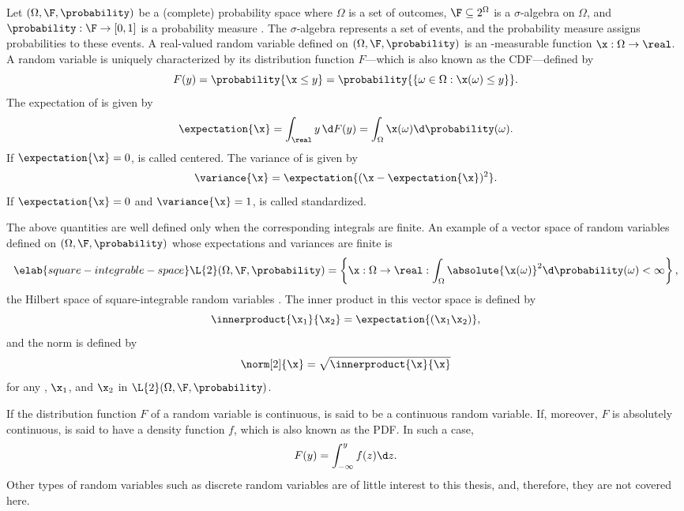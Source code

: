 Let $(\Omega, \F, \probability)$ be a (complete) probability space where
$\Omega$ is a set of outcomes, $\F \subseteq 2^\Omega$ is a $\sigma$-algebra on
$\Omega$, and $\probability: \F \to [0, 1]$ is a probability measure
\cite{durrett2010}. The $\sigma$-algebra represents a set of events, and the
probability measure assigns probabilities to these events. A real-valued random
variable defined on $(\Omega, \F, \probability)$ is an \F-measurable function
$\x: \Omega \to \real$. A random variable \x is uniquely characterized by its
distribution function $F$---which is also known as the \acf{CDF}---defined by
\begin{equation*}
  F(y) = \probability{\x \leq y} = \probability{\{ \omega \in \Omega: \x(\omega) \leq y \}}.
\end{equation*}
The expectation of \x is given by
\[
  \expectation{\x} = \int_\real y \, \d F(y) = \int_\Omega \x(\omega) \d \probability(\omega).
\]
If $\expectation{\x} = 0$, \x is called centered. The variance of \x is given
by
\[
  \variance{\x} = \expectation{(\x - \expectation{\x})^2}.
\]
If $\expectation{\x} = 0$ and $\variance{\x} = 1$, \x is called standardized.

The above quantities are well defined only when the corresponding integrals are
finite. An example of a vector space of random variables defined on $(\Omega,
\F, \probability)$ whose expectations and variances are finite is
\begin{equation} \elab{square-integrable-space}
  \L{2}(\Omega, \F, \probability) = \left\{ \x: \Omega \to \real: \int_\Omega \absolute{\x(\omega)}^2 \d \probability(\omega) < \infty \right\},
\end{equation}
the Hilbert space of square-integrable random variables \cite{janson1997}. The
inner product in this vector space is defined by
\[
  \innerproduct{\x_1}{\x_2} = \expectation{(\x_1 \x_2)},
\]
and the norm is defined by
\[
  \norm[2]{\x} = \sqrt{\innerproduct{\x}{\x}}
\]
for any \x, $\x_1$, and $\x_2$ in $\L{2}(\Omega, \F, \probability)$.

If the distribution function $F$ of a random variable \x is continuous, \x is
said to be a continuous random variable. If, moreover, $F$ is absolutely
continuous, \x is said to have a density function $f$, which is also known as
the \acf{PDF}. In such a case,
\[
  F(y) = \int_{-\infty}^y f(z) \d z.
\]
Other types of random variables such as discrete random variables are of little
interest to this thesis, and, therefore, they are not covered here.


